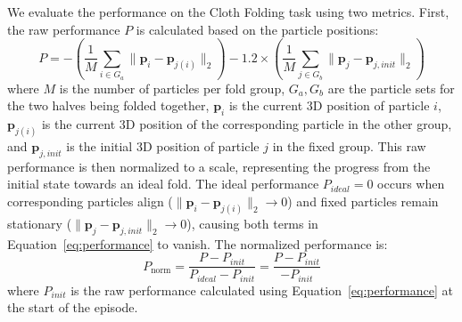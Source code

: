 \documentclass{article} %
\begin{document}
We evaluate the performance on the Cloth Folding task using two metrics. First, the raw performance \(P\) is calculated based on the particle positions:
\begin{equation} \label{eq:performance}
P = - \left( \frac{1}{M} \sum_{i \in G_a} \| \mathbf{p}_i - \mathbf{p}_{j(i)} \|_2 \right) - 1.2 \times \left( \frac{1}{M} \sum_{j \in G_b} \| \mathbf{p}_j - \mathbf{p}_{j, init} \|_2 \right)
\end{equation}
where \(M\) is the number of particles per fold group, \(G_a, G_b\) are the particle sets for the two halves being folded together, \(\mathbf{p}_i\) is the current 3D position of particle \(i\), \(\mathbf{p}_{j(i)}\) is the current 3D position of the corresponding particle in the other group, and \(\mathbf{p}_{j, init}\) is the initial 3D position of particle \(j\) in the fixed group.
This raw performance is then normalized to a scale, representing the progress from the initial state towards an ideal fold. The ideal performance \(P_{ideal} = 0\) occurs when corresponding particles align (\(\| \mathbf{p}_i - \mathbf{p}_{j(i)} \|_2 \to 0\)) and fixed particles remain stationary (\(\| \mathbf{p}_j - \mathbf{p}_{j, init} \|_2 \to 0\)), causing both terms in Equation~\eqref{eq:performance} to vanish. The normalized performance is:
\begin{equation} \label{eq:norm_performance}
P_{\text{norm}} = \frac{P - P_{init}}{P_{ideal} - P_{init}} = \frac{P - P_{init}}{- P_{init}}
\end{equation}
where \(P_{init}\) is the raw performance calculated using Equation~\eqref{eq:performance} at the start of the episode.
\end{document}
